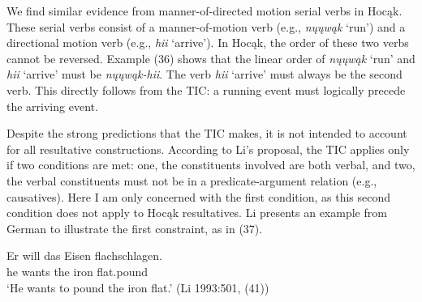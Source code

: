 \documentclass[output=paper]{LSP/langsci}
\begin{document}
We find similar evidence from manner-of-directed motion serial verbs in Hocąk. These serial verbs consist of a manner-of-motion verb (e.g., \textit{nųųwąk} `run') and a directional motion verb (e.g., \textit{hii} `arrive'). In Hocąk, the order of these two verbs cannot be reversed. Example (36) shows that the linear order of \textit{nųųwąk} `run' and \textit{hii} `arrive' must be \textit{nųųwąk-hii}. The verb \textit{hii} `arrive' must always be the second verb. This directly follows from the TIC: a running event must logically precede the arriving event.

\begin{exe}
\ex
\begin{xlist}



\end{xlist}
\end{exe}

Despite the strong predictions that the TIC makes, it is not intended to account for all resultative constructions. According to Li's proposal, the TIC applies only if two conditions are met: one, the constituents involved are both verbal, and two, the verbal constituents must not be in a predicate-argument relation (e.g., causatives). Here I am only concerned with the first condition, as this second condition does not apply to Hocąk resultatives. Li presents an example from German to illustrate the first constraint, as in (37).

\begin{exe}

\ex \gll Er will das Eisen flachschlagen.\\
he wants the iron flat.pound\\
\glt `He wants to pound the iron flat.' (Li 1993:501, (41))

\end{exe}
\end{document}
